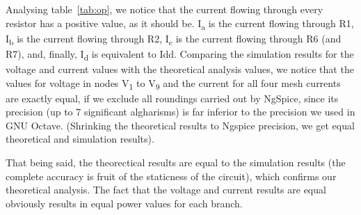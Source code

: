 Analysing table~\ref{tab:op}, we notice that the current flowing through every resistor has a positive value, as it should be. I\textsubscript{a} is the current flowing through R1, I\textsubscript{b} is the current flowing through R2, I\textsubscript{c} is the current flowing through R6 (and R7), and, finally, I\textsubscript{d} is equivalent to Idd.
Comparing the simulation results for the voltage and current values with the theoretical analysis values, we notice that the values for voltage in nodes V\textsubscript{1} to V\textsubscript{9} and the current for all four mesh currents are exactly equal, if we exclude all roundings carried out by NgSpice, since its precision (up to 7 significant algharisms) is far inferior to the precision we used in GNU Octave. (Shrinking the theoretical results to Ngspice precision, we get equal theoretical and simulation results).

That being said, the theorectical results are equal to the simulation results (the complete accuracy is fruit of the staticness of the circuit), which confirms our theoretical analysis. The fact that the voltage and current results are equal obviously results in equal power values for each branch.

